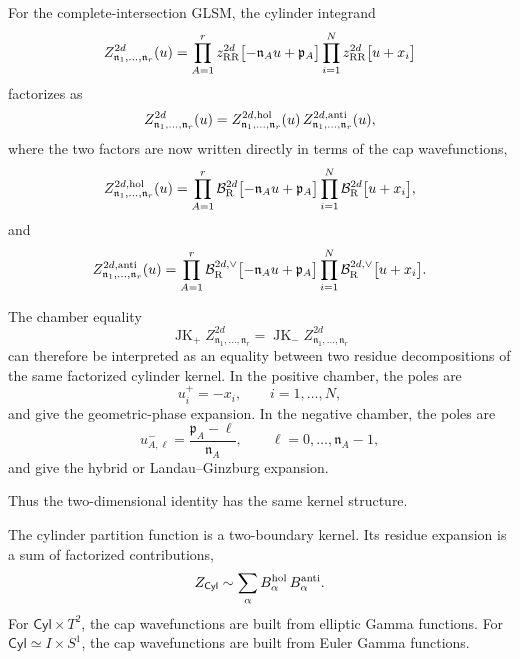 \documentclass[11pt,a4paper]{article}
\numberwithin{equation}{section}
\theoremstyle{plain}
\theoremstyle{definition}
\theoremstyle{remark}
\newcommand{\cyl}{\mathsf{Cyl}}
\begin{document}
For the complete-intersection GLSM, the cylinder integrand
\begin{equation}
Z_{\mathfrak n_1,\ldots,\mathfrak n_r}^{2d}(u)
=
\prod_{A=1}^{r}
z_{\rm RR}^{2d}\bigl[-\mathfrak n_Au+\mathfrak p_A\bigr]
\prod_{i=1}^{N}
z_{\rm RR}^{2d}\bigl[u+x_i\bigr]
\end{equation}
factorizes as
\begin{equation}
Z_{\mathfrak n_1,\ldots,\mathfrak n_r}^{2d}(u)
=
Z_{\mathfrak n_1,\ldots,\mathfrak n_r}^{2d,{\rm hol}}(u)\,
Z_{\mathfrak n_1,\ldots,\mathfrak n_r}^{2d,{\rm anti}}(u),
\label{eq:CI-2d-factorization}
\end{equation}
where the two factors are now written directly in terms of the cap wavefunctions,
\begin{equation}
Z_{\mathfrak n_1,\ldots,\mathfrak n_r}^{2d,{\rm hol}}(u)
=
\prod_{A=1}^{r}
\mathcal B_{\mathrm R}^{2d}\bigl[-\mathfrak n_Au+\mathfrak p_A\bigr]
\prod_{i=1}^{N}
\mathcal B_{\mathrm R}^{2d}\bigl[u+x_i\bigr],
\label{eq:CI-2d-hol-block}
\end{equation}
and
\begin{equation}
Z_{\mathfrak n_1,\ldots,\mathfrak n_r}^{2d,{\rm anti}}(u)
=
\prod_{A=1}^{r}
\mathcal B_{\mathrm R}^{2d,\vee}\bigl[-\mathfrak n_Au+\mathfrak p_A\bigr]
\prod_{i=1}^{N}
\mathcal B_{\mathrm R}^{2d,\vee}\bigl[u+x_i\bigr].
\label{eq:CI-2d-anti-block}
\end{equation}

The chamber equality
\begin{equation}
\operatorname{JK}_{+}
Z_{\mathfrak n_1,\ldots,\mathfrak n_r}^{2d}
=
\operatorname{JK}_{-}
Z_{\mathfrak n_1,\ldots,\mathfrak n_r}^{2d}
\end{equation}
can therefore be interpreted as an equality between two residue decompositions of the same factorized cylinder kernel. In the positive chamber, the poles are
\begin{equation}
u_i^+=-x_i,
\qquad
i=1,\ldots,N,
\end{equation}
and give the geometric-phase expansion. In the negative chamber, the poles are
\begin{equation}
u_{A,\ell}^-=
\frac{\mathfrak p_A-\ell}{\mathfrak n_A},
\qquad
\ell=0,\ldots,\mathfrak n_A-1,
\end{equation}
and give the hybrid or Landau--Ginzburg expansion.

Thus the two-dimensional identity has the same kernel structure.

The cylinder partition function is a two-boundary kernel.  Its residue expansion is a sum of factorized contributions,
\begin{equation}
Z_{\cyl}
\sim
\sum_{\alpha}
B_{\alpha}^{\rm hol}\,
B_{\alpha}^{\rm anti}.
\end{equation}
For \(\cyl\times T^2\), the cap wavefunctions are built from elliptic Gamma functions. For \(\cyl\simeq I\times S^1\), the cap wavefunctions are built from Euler Gamma functions.
\end{document}
